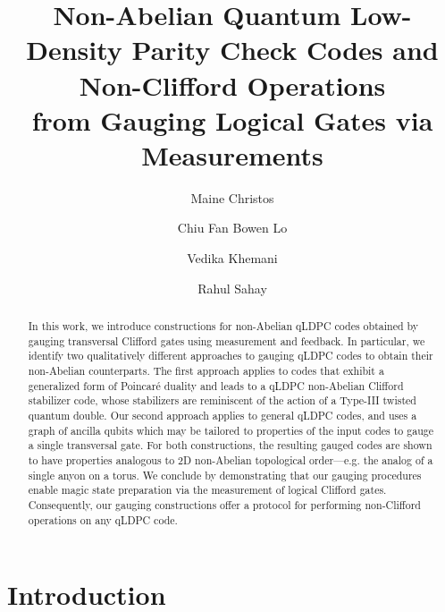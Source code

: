 \documentclass[aps,prx,reprint,superscriptaddress,nofootinbib]{revtex4-2}
\theoremstyle{definition}
\newcommand{\<}{\langle}
\renewcommand{\>}{\rangle}
\begin{document}
\title{Non-Abelian Quantum Low-Density Parity Check Codes and Non-Clifford Operations\\ from Gauging Logical Gates via Measurements}

\author{Maine Christos}
\author{Chiu Fan Bowen Lo}
\author{Vedika Khemani}
\author{Rahul Sahay}

\begin{abstract}

In this work, we introduce constructions for non-Abelian qLDPC codes obtained by gauging transversal Clifford gates using measurement and feedback.
%
In particular, we identify two qualitatively different approaches to gauging qLDPC codes to obtain their non-Abelian counterparts.
%
The first approach applies to codes that exhibit a generalized form of Poincar\'e duality and leads to a qLDPC non-Abelian Clifford stabilizer code, whose stabilizers are reminiscent of the action of a Type-III twisted quantum double.
%
Our second approach applies to general qLDPC codes, and uses a graph of ancilla qubits which may be tailored to properties of the input codes to gauge a single transversal gate.
%
%
For both constructions, the resulting gauged codes are shown to have properties analogous to 2D non-Abelian topological order---e.g. the analog of a single anyon on a torus. 
%
We conclude by demonstrating that our gauging procedures enable magic state preparation via the measurement of logical Clifford gates.
%
Consequently, our gauging constructions offer a protocol for performing non-Clifford operations on any qLDPC code.

\end{abstract}


\maketitle

\section{Introduction}
\end{document}
